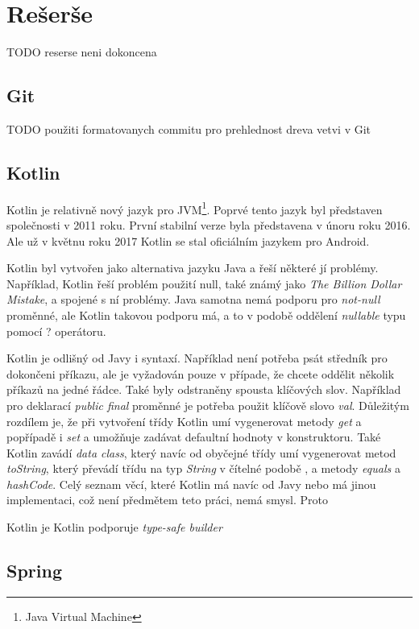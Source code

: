 \chapter{Rešerše}\label{resere}
TODO reserse neni dokoncena
\section{Git}\label{reserse:git}
    TODO použiti formatovanych commitu pro prehlednost dreva vetvi v Git
\section{Kotlin}\label{resere:kotlin}
    Kotlin je relativně nový jazyk pro JVM\footnote{Java Virtual Machine}. Poprvé tento jazyk byl představen společnosti v 2011 roku. První stabilní verze byla představena v únoru roku 2016. Ale už v květnu roku 2017 Kotlin se stal oficiálním jazykem pro Android.
    
    Kotlin byl vytvořen jako alternativa jazyku Java a řeší některé jí problémy. Například, Kotlin řeší problém použití null, také známý jako \textit{The Billion Dollar Mistake}\cite{theBDM}, a spojené s ní problémy. Java samotna nemá podporu pro \textit{not-null} proměnné, ale Kotlin takovou podporu má, a to v podobě oddělení \textit{nullable} typu pomocí ? operátoru.
    
    Kotlin je odlišný od Javy i syntaxí. Například není potřeba psát středník pro dokončeni příkazu, ale je vyžadován pouze v případe, že chcete oddělit několik příkazů na jedné řádce. Také byly odstraněny spousta klíčových slov. Například pro deklarací \textit{public final} proměnné je potřeba použit klíčově slovo \textit{val}. Důležitým rozdílem je, že při vytvoření třídy Kotlin umí vygenerovat metody \textit{get} a popřípadě i \textit{set} a umožňuje zadávat defaultní hodnoty v konstruktoru. Také Kotlin zavádí \textit{data class}, který navíc od obyčejné třídy umí vygenerovat metod \textit{toString}, který převádí třídu na typ \textit{String} v čítelné podobě \cite{Priklad vygenerovane tridy}, a metody \textit{equals} a \textit{hashCode}. Celý seznam věcí, které Kotlin má navíc od Javy nebo má jinou implementaci, což není předmětem teto práci, nemá smysl. Proto 
    
    
    Kotlin je Kotlin podporuje \textit{type-safe builder}
\section{Spring}\label{resere:j2ee}
    
